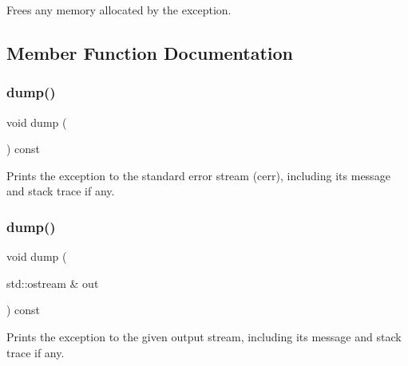 Frees any memory allocated by the exception. 



\subsection{Member Function Documentation}
\mbox{\label{classErrorException_af1e6a5fb477a95a876e86ceadf065ffd}} 
\subsubsection{\texorpdfstring{dump()}{dump()}\hspace{0.1cm}{\footnotesize\ttfamily [1/2]}}
{\footnotesize\ttfamily void dump (\begin{DoxyParamCaption}{ }\end{DoxyParamCaption}) const\hspace{0.3cm}{\ttfamily [virtual]}}



Prints the exception to the standard error stream (cerr), including its message and stack trace if any. 

\mbox{\label{classErrorException_a277bc85222ba9a7d0fd47fd10d44d115}} 
\subsubsection{\texorpdfstring{dump()}{dump()}\hspace{0.1cm}{\footnotesize\ttfamily [2/2]}}
{\footnotesize\ttfamily void dump (\begin{DoxyParamCaption}\item[{std\+::ostream \&}]{out }\end{DoxyParamCaption}) const\hspace{0.3cm}{\ttfamily [virtual]}}



Prints the exception to the given output stream, including its message and stack trace if any. 

\mbox{\label{classErrorException_ae6faf7d90a6394517c0328748c99ec1d}} 
